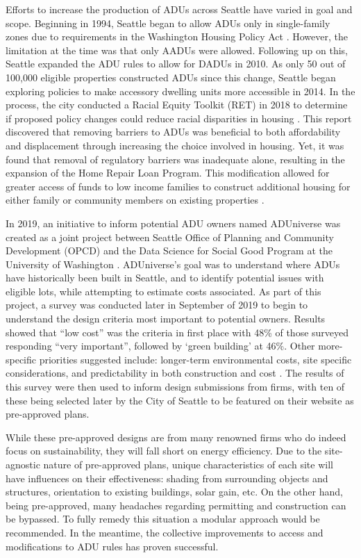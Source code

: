 Efforts to increase the production of ADUs across Seattle have varied in goal and scope.  Beginning in 1994, Seattle began to allow ADUs only in single-family zones due to requirements in the Washington Housing Policy Act \cite{levyADUsPoliciesRacial2019}. However, the limitation at the time was that only AADUs were allowed. Following up on this, Seattle expanded the ADU rules to allow for DADUs in 2010. As only 50 out of 100,000 eligible properties constructed ADUs since this change, Seattle began exploring policies to make accessory dwelling units more accessible in 2014. In the process, the city conducted a Racial Equity Toolkit (RET) in 2018 to determine if proposed policy changes could reduce racial disparities in housing \cite{welchAccessoryDwellingUnits2021}. This report discovered that removing barriers to ADUs was beneficial to both affordability and displacement through increasing the choice involved in housing. Yet, it was found that removal of regulatory barriers was inadequate alone, resulting in the expansion of the Home Repair Loan Program. This modification allowed for greater access of funds to low income families to construct additional housing for either family or community members on existing properties \cite{welchAccessoryDwellingUnits2021}.

In 2019, an initiative to inform potential ADU owners named ADUniverse was created as a joint project between Seattle Office of Planning and Community Development (OPCD) and the Data Science for Social Good Program at the University of Washington \cite{mohlerADUniverseToolEScience2019}. ADUniverse’s goal was to understand where ADUs have historically been built in Seattle, and to identify potential issues with eligible lots, while attempting to estimate costs associated. As part of this project, a survey was conducted later in September of 2019 to begin to understand the design criteria most important to potential owners. Results showed that “low cost” was the criteria in first place with 48\% of those surveyed responding “very important”, followed by ‘green building’ at 46\%. Other more-specific priorities suggested include: longer-term environmental costs, site specific considerations, and predictability in both construction and cost \cite{PreapprovedPlansAccessory2019}. The results of this survey were then used to inform design submissions from firms, with ten of these being selected later by the City of Seattle to be featured on their website as pre-approved plans.

While these pre-approved designs are from many renowned firms who do indeed focus on sustainability, they will fall short on energy efficiency. Due to the site-agnostic nature of pre-approved plans, unique characteristics of each site will have influences on their effectiveness: shading from surrounding objects and structures, orientation to existing buildings, solar gain, etc. On the other hand, being pre-approved, many headaches regarding permitting and construction can be bypassed. To fully remedy this situation a modular approach would be recommended. In the meantime, the collective improvements to access and modifications to ADU rules has proven successful.

